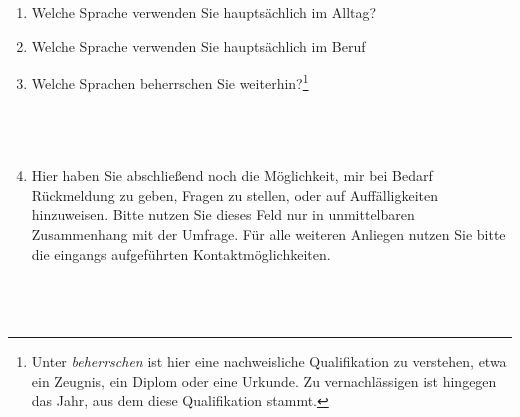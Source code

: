 \begin{enumerate}[resume]
\item Welche Sprache verwenden Sie hauptsächlich im Alltag?\\
	   \underline{\hspace{7.5cm}}

\item Welche Sprache verwenden Sie hauptsächlich im Beruf\\
	   \underline{\hspace{7.5cm}}
       
       
\item Welche Sprachen beherrschen Sie weiterhin?\footnote{Unter \textit{beherrschen} ist hier eine nachweisliche Qualifikation zu verstehen, etwa ein Zeugnis, ein Diplom oder eine Urkunde. Zu vernachlässigen ist hingegen das Jahr, aus dem diese Qualifikation stammt.}\\
	   \underline{\hspace{7.5cm}}\\ 
       \underline{\hspace{7.5cm}}\\   
       \underline{\hspace{7.5cm}}\\   
       \underline{\hspace{7.5cm}}
       

\item Hier haben Sie abschließend noch die Möglichkeit, mir bei Bedarf Rückmeldung zu geben, Fragen zu stellen, oder auf Auffälligkeiten hinzuweisen. Bitte nutzen Sie dieses Feld nur in unmittelbaren Zusammenhang mit der Umfrage. Für alle weiteren Anliegen nutzen Sie bitte die eingangs aufgeführten Kontaktmöglichkeiten.\\
       \underline{\hspace{7.5cm}}\\ 
       \underline{\hspace{7.5cm}}\\   
       \underline{\hspace{7.5cm}}\\   
       \underline{\hspace{7.5cm}}
\end{enumerate}
